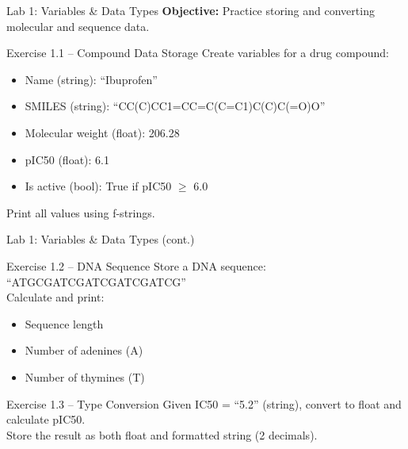 \documentclass{beamer}
\begin{document}
\begin{frame}{\textcolor{labcolor}{Lab 1: Variables \& Data Types}}
    \footnotesize
    \textbf{Objective:} Practice storing and converting molecular and sequence data.
    \vspace{0.3em}
    \begin{block}{Exercise 1.1 -- Compound Data Storage}
        Create variables for a drug compound:
        \begin{itemize}\setlength{\itemsep}{0pt}
            \item Name (string): ``Ibuprofen''
            \item SMILES (string): ``CC(C)CC1=CC=C(C=C1)C(C)C(=O)O''
            \item Molecular weight (float): 206.28
            \item pIC50 (float): 6.1
            \item Is active (bool): True if pIC50 $\geq$ 6.0
        \end{itemize}
        Print all values using f-strings.
    \end{block}
\end{frame}

\begin{frame}{\textcolor{labcolor}{Lab 1: Variables \& Data Types (cont.)}}
    \small
    \begin{block}{Exercise 1.2 -- DNA Sequence}
        Store a DNA sequence: ``ATGCGATCGATCGATCGATCG''\\
        Calculate and print:
        \begin{itemize}
            \item Sequence length
            \item Number of adenines (A)
            \item Number of thymines (T)
        \end{itemize}
    \end{block}
    \vspace{0.5em}
    \begin{block}{Exercise 1.3 -- Type Conversion}
        Given IC50 = ``5.2'' (string), convert to float and calculate pIC50.\\
        Store the result as both float and formatted string (2 decimals).
    \end{block}
\end{frame}

\end{document}
